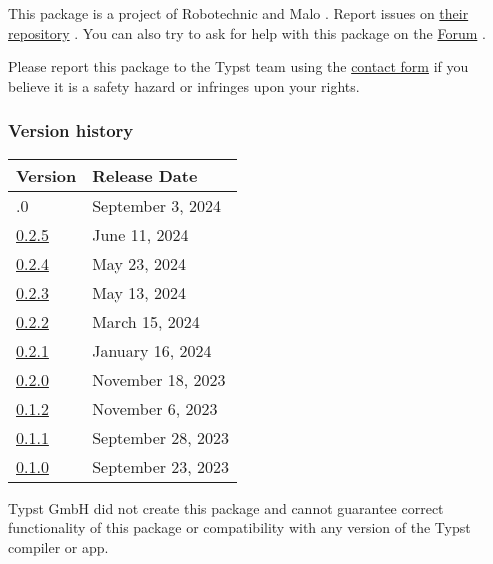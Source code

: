 This package is a project of Robotechnic and Malo . Report issues on
\href{https://github.com/Robotechnic/diagraph.git}{their repository} .
You can also try to ask for help with this package on the
\href{https://forum.typst.app}{Forum} .

Please report this package to the Typst team using the
\href{https://typst.app/contact}{contact form} if you believe it is a
safety hazard or infringes upon your rights.

\label{versions}
\subsubsection{Version history}\label{version-history}

\begin{longtable}[]{@{}ll@{}}
\toprule\noalign{}
Version & Release Date \\
\midrule\noalign{}
\endhead
\bottomrule\noalign{}
\endlastfoot
0.3.0 & September 3, 2024 \\
\href{https://typst.app/universe/package/diagraph/0.2.5/}{0.2.5} & June
11, 2024 \\
\href{https://typst.app/universe/package/diagraph/0.2.4/}{0.2.4} & May
23, 2024 \\
\href{https://typst.app/universe/package/diagraph/0.2.3/}{0.2.3} & May
13, 2024 \\
\href{https://typst.app/universe/package/diagraph/0.2.2/}{0.2.2} & March
15, 2024 \\
\href{https://typst.app/universe/package/diagraph/0.2.1/}{0.2.1} &
January 16, 2024 \\
\href{https://typst.app/universe/package/diagraph/0.2.0/}{0.2.0} &
November 18, 2023 \\
\href{https://typst.app/universe/package/diagraph/0.1.2/}{0.1.2} &
November 6, 2023 \\
\href{https://typst.app/universe/package/diagraph/0.1.1/}{0.1.1} &
September 28, 2023 \\
\href{https://typst.app/universe/package/diagraph/0.1.0/}{0.1.0} &
September 23, 2023 \\
\end{longtable}

Typst GmbH did not create this package and cannot guarantee correct
functionality of this package or compatibility with any version of the
Typst compiler or app.
